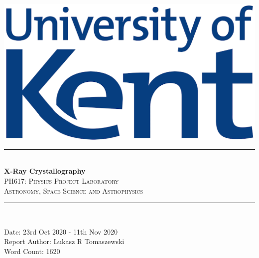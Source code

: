\documentclass[12pt]{article}
\title{}
\begin{document}
\begin{titlepage}
\newcommand{\HRule}{\rule{\linewidth}{0.5mm}}
\begin{centering} 
\includegraphics[scale=0.7]{Images/Uni_of_Kent.png}\\[1cm]
\HRule \\ [0.3cm]
\Huge{\bfseries{X-Ray Crystallography}} \\
\textsc{\large PH617: Physics Project Laboratory}\\ [-0.1cm]
\textsc{\large Astronomy, Space Science and Astrophysics}\\ [-0.2cm]
\HRule \\[0.5cm]
\begin{minipage}{0.625\textwidth}
\begin{center} \large
{\large Date: 23rd Oct 2020 - 11th Nov 2020}\\[0.2cm]
{\large Report Author: Lukasz R Tomaszewski}\\[0.2cm]
{\large Word Count: 1620}\\
\end{center}
\end{minipage}\\[2cm]
\vfill
\end{centering} 
\end{titlepage}
\newpage
\begin{titlepage}
\begin{tableofcontents}
\end{tableofcontents}
\end{titlepage}
\newpage
\end{document}
